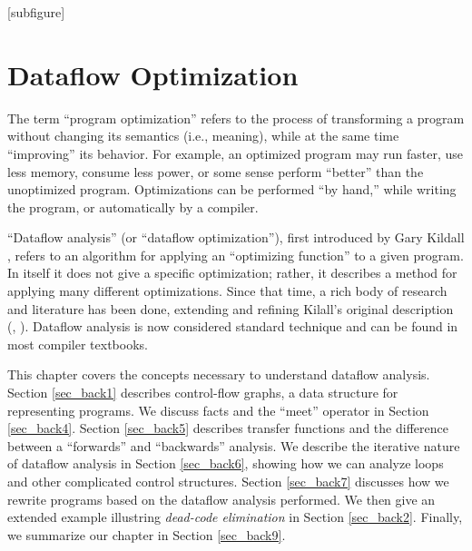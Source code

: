 \documentclass[12pt]{report}
\begin{document}

[subfigure]
\renewcommand{\textfraction}{0.1}
\renewcommand{\topfraction}{0.9}
\newcommand{\inE}{\emph{in}\xspace}
\newcommand{\out}{\emph{out}\xspace}
\newcommand{\In}{\emph{In}\xspace}
\newcommand{\Out}{\emph{Out}\xspace}

\chapter{Dataflow Optimization}
\label{ref_chapter_background}



The term ``program optimization'' refers to the process of
transforming a program without changing its semantics (i.e., meaning),
while at the same time ``improving'' its behavior.  For example, an
optimized program may run faster, use less memory, consume less power,
or some sense perform ``better'' than the unoptimized
program. Optimizations can be performed ``by hand,'' while writing
the program, or automatically by a compiler. 

``Dataflow analysis'' (or ``dataflow optimization''), first introduced
by Gary Kildall \citep{Kildall1973}, refers to an algorithm for
applying an ``optimizing function'' to a given program. In itself it
does not give a specific optimization; rather, it describes a method
for applying many different optimizations. Since that time, a rich
body of research and literature has been done, extending and refining
Kilall's original description (\cite{SomePaperXX},
\cite{SomeBookXX}). Dataflow analysis is now considered standard
technique and can be found in most compiler textbooks.

This chapter covers the concepts necessary to understand dataflow
analysis. Section \ref{sec_back1} describes control-flow graphs, a
data structure for representing programs. We discuss facts and the
``meet'' operator in Section \ref{sec_back4}.  Section \ref{sec_back5}
describes transfer functions and the difference between a ``forwards''
and ``backwards'' analysis. We describe the iterative nature of
dataflow analysis in Section \ref{sec_back6}, showing how we can
analyze loops and other complicated control structures. Section
\ref{sec_back7} discusses how we rewrite programs based on the
dataflow analysis performed. We then give an extended example
illustring \emph{dead-code elimination} in Section
\ref{sec_back2}. Finally, we summarize our chapter in Section
\ref{sec_back9}.
\end{document}

